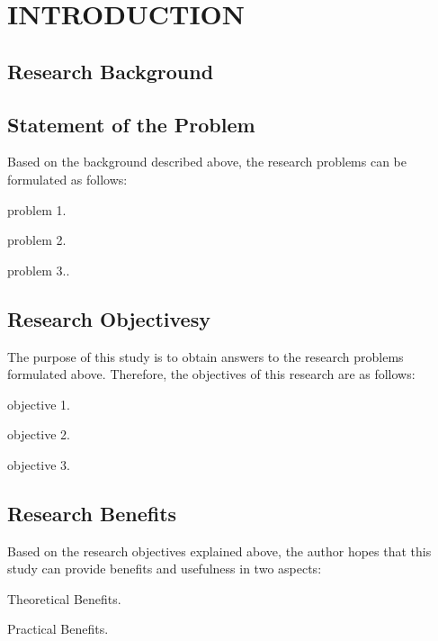 \chapter{INTRODUCTION}
	\section{Research Background}
	\setlength{\leftskip}{0.7cm}
	\lipsum
	
	\section{Statement of the Problem}
	Based on the background described above, the research problems can be formulated as follows:
	
	\begin{secenumerate}
		\item problem 1.
		\item problem 2.
		\item problem 3..
	\end{secenumerate}
	
	\section{Research Objectivesy}
	The purpose of this study is to obtain answers to the research problems formulated above. Therefore, the objectives of this research are as follows:
	\begin{secenumerate}
		\item objective 1.
		\item objective 2.
		\item objective 3.
	\end{secenumerate}
	
	\section{Research Benefits}
	Based on the research objectives explained above, the author hopes that this study can provide benefits and usefulness in two aspects:
	\begin{secenumerate}
		\item Theoretical Benefits.
		\begin{secenumerate}
			\item \lipsum[1]
			\item \lipsum[1]
		\end{secenumerate}
		\item Practical Benefits.
		\begin{secenumerate}
			\item \lipsum[1]
			\item \lipsum[1]
		\end{secenumerate}
	\end{secenumerate}